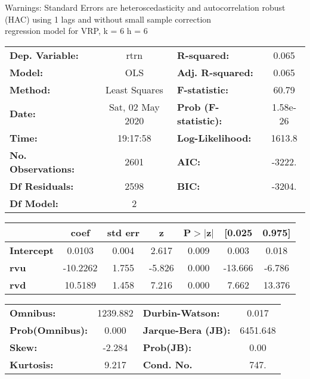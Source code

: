 Warnings: \newline
 [1] Standard Errors are heteroscedasticity and autocorrelation robust (HAC) using 1 lags and without small sample correction\\ 

regression model for VRP, k = 6 h = 6\begin{center}
\begin{tabular}{lclc}
\toprule
\textbf{Dep. Variable:}    &       rtrn       & \textbf{  R-squared:         } &     0.065   \\
\textbf{Model:}            &       OLS        & \textbf{  Adj. R-squared:    } &     0.065   \\
\textbf{Method:}           &  Least Squares   & \textbf{  F-statistic:       } &     60.79   \\
\textbf{Date:}             & Sat, 02 May 2020 & \textbf{  Prob (F-statistic):} &  1.58e-26   \\
\textbf{Time:}             &     19:17:58     & \textbf{  Log-Likelihood:    } &    1613.8   \\
\textbf{No. Observations:} &        2601      & \textbf{  AIC:               } &    -3222.   \\
\textbf{Df Residuals:}     &        2598      & \textbf{  BIC:               } &    -3204.   \\
\textbf{Df Model:}         &           2      & \textbf{                     } &             \\
\bottomrule
\end{tabular}
\begin{tabular}{lcccccc}
                   & \textbf{coef} & \textbf{std err} & \textbf{z} & \textbf{P$> |$z$|$} & \textbf{[0.025} & \textbf{0.975]}  \\
\midrule
\textbf{Intercept} &       0.0103  &        0.004     &     2.617  &         0.009        &        0.003    &        0.018     \\
\textbf{rvu}       &     -10.2262  &        1.755     &    -5.826  &         0.000        &      -13.666    &       -6.786     \\
\textbf{rvd}       &      10.5189  &        1.458     &     7.216  &         0.000        &        7.662    &       13.376     \\
\bottomrule
\end{tabular}
\begin{tabular}{lclc}
\textbf{Omnibus:}       & 1239.882 & \textbf{  Durbin-Watson:     } &    0.017  \\
\textbf{Prob(Omnibus):} &   0.000  & \textbf{  Jarque-Bera (JB):  } & 6451.648  \\
\textbf{Skew:}          &  -2.284  & \textbf{  Prob(JB):          } &     0.00  \\
\textbf{Kurtosis:}      &   9.217  & \textbf{  Cond. No.          } &     747.  \\
\bottomrule
\end{tabular}
\end{center}

